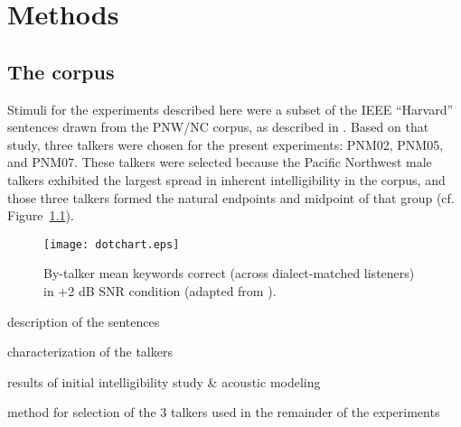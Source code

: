 \chapter{Methods}
\section{The corpus}
Stimuli for the experiments described here were a subset of the IEEE “Harvard” sentences \citep{HarvardSents} drawn from the PNW/NC corpus, as described in \citet{McCloyEtAl2013}.  Based on that study, three talkers were chosen for the present experiments: PNM02, PNM05, and PNM07.  These talkers were selected because the Pacific Northwest male talkers exhibited the largest spread in inherent intelligibility in the corpus, and those three talkers formed the natural endpoints and midpoint of that group (cf. Figure~\ref{fig:dotchart}).

\begin{figure}
	\begin{centering}
	\texttt{[image: dotchart.eps]}
	\caption{By-talker mean keywords correct (across dialect-matched listeners) in +2 dB SNR condition (adapted from \citet{McCloyEtAl2013}).\label{fig:dotchart}}
	\end{centering}
\end{figure}

\begin{itm}
	\item{description of the sentences}
	\item{characterization of the talkers}
	\item{results of initial intelligibility study \& acoustic modeling}
	\item{method for selection of the 3 talkers used in the remainder of the experiments}
\end{itm}


